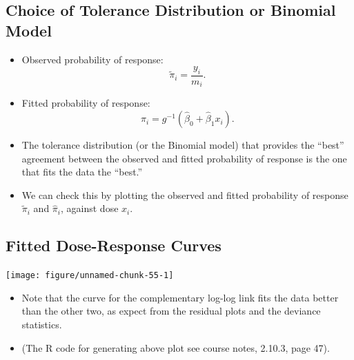 \documentclass{article}\usepackage[]{graphicx}\usepackage[svgnames]{xcolor}
\newenvironment{knitrout}{}{} %
\begin{document}
\subsection*{Choice of Tolerance Distribution or Binomial Model}
\begin{itemize}
      \item Observed probability of response:
            \[ \tilde{\pi}_i=\frac{y_i}{m_i}. \]
      \item Fitted probability of response:
            \[ \hat{\pi}_i=g^{-1}(\hat{\beta}_0+\hat{\beta}_1x_i). \]
      \item The tolerance distribution (or the Binomial model) that provides the ``best''
            agreement between the observed and fitted probability of response is the one that fits the data the ``best.''
      \item We can check this by plotting the observed and fitted probability of response $ \tilde{\pi}_i $ and $ \hat{\pi}_i $,
            against dose $ x_i $.
\end{itemize}
\subsection*{Fitted Dose-Response Curves}
\begin{knitrout}
\color{fgcolor}

{\centering \texttt{[image: figure/unnamed-chunk-55-1]} 

}


\end{knitrout}
\begin{itemize}
      \item Note that the curve for the complementary log-log link fits the data better than
            the other two, as expect from the residual plots and the deviance statistics.
      \item (The R code for generating above plot see course notes, 2.10.3, page 47).
\end{itemize}
\end{document}
